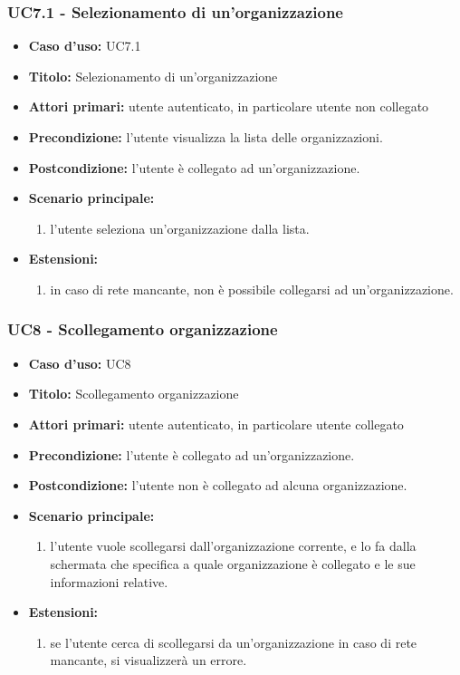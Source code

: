 \documentclass[casi-duso]{subfiles}
\begin{document}
\subsubsection{UC7.1 - Selezionamento di un'organizzazione}
\label{subsub:uc7utente}
\begin{itemize}
  \item \textbf{Caso d’uso:} UC7.1
  \item \textbf{Titolo:} Selezionamento di un'organizzazione
  \item \textbf{Attori primari:} utente autenticato, in particolare utente non collegato
  \item \textbf{Precondizione:} l'utente visualizza la lista delle organizzazioni.
  \item \textbf{Postcondizione:} l'utente è collegato ad un'organizzazione.
  \item \textbf{Scenario principale:} 
  \begin{enumerate}
    \item l'utente seleziona un'organizzazione dalla lista.
  \end{enumerate}  
  \item \textbf{Estensioni:} 
  \begin{enumerate}
    \item in caso di rete mancante, non è possibile collegarsi ad un'organizzazione.
  \end{enumerate}  
\end{itemize}

\subsubsection{UC8 - Scollegamento organizzazione}
\label{subsub:uc8utente}
\begin{itemize}
  \item \textbf{Caso d’uso:} UC8
  \item \textbf{Titolo:} Scollegamento organizzazione
  \item \textbf{Attori primari:} utente autenticato, in particolare utente collegato
  \item \textbf{Precondizione:} l'utente è collegato ad un'organizzazione.
  \item \textbf{Postcondizione:} l'utente non è collegato ad alcuna organizzazione.
  \item \textbf{Scenario principale:} 
  \begin{enumerate}
    \item l'utente vuole scollegarsi dall'organizzazione corrente, e lo fa dalla schermata che specifica a quale organizzazione è collegato e le 
    sue informazioni relative.
  \end{enumerate}  
  \item \textbf{Estensioni:} 
  \begin{enumerate}
    \item se l'utente cerca di scollegarsi da un'organizzazione in caso di rete mancante, si visualizzerà un errore.
  \end{enumerate}  
\end{itemize}
\end{document}
